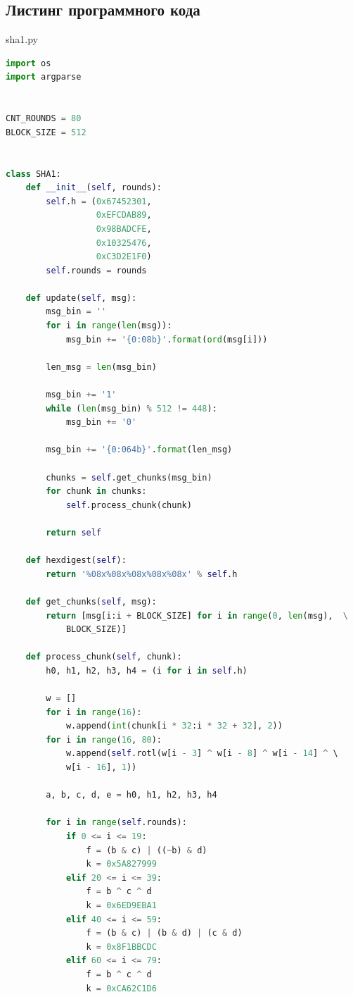 \documentclass[12pt]{article}
\begin{document}
\subsection*{Листинг программного кода}
sha1.py
\begin{lstlisting}[language=Python]
import os
import argparse


CNT_ROUNDS = 80
BLOCK_SIZE = 512


class SHA1:
    def __init__(self, rounds):
        self.h = (0x67452301,
                  0xEFCDAB89,
                  0x98BADCFE,
                  0x10325476,
                  0xC3D2E1F0)
        self.rounds = rounds

    def update(self, msg):
        msg_bin = ''
        for i in range(len(msg)):
            msg_bin += '{0:08b}'.format(ord(msg[i]))

        len_msg = len(msg_bin)

        msg_bin += '1'
        while (len(msg_bin) % 512 != 448):
            msg_bin += '0'

        msg_bin += '{0:064b}'.format(len_msg)

        chunks = self.get_chunks(msg_bin)
        for chunk in chunks:
            self.process_chunk(chunk)

        return self

    def hexdigest(self):
        return '%08x%08x%08x%08x%08x' % self.h

    def get_chunks(self, msg):
        return [msg[i:i + BLOCK_SIZE] for i in range(0, len(msg),  \
            BLOCK_SIZE)]

    def process_chunk(self, chunk):
        h0, h1, h2, h3, h4 = (i for i in self.h)

        w = []
        for i in range(16):
            w.append(int(chunk[i * 32:i * 32 + 32], 2))
        for i in range(16, 80):
            w.append(self.rotl(w[i - 3] ^ w[i - 8] ^ w[i - 14] ^ \ 
            w[i - 16], 1))

        a, b, c, d, e = h0, h1, h2, h3, h4

        for i in range(self.rounds):
            if 0 <= i <= 19:
                f = (b & c) | ((~b) & d)
                k = 0x5A827999
            elif 20 <= i <= 39:
                f = b ^ c ^ d
                k = 0x6ED9EBA1
            elif 40 <= i <= 59:
                f = (b & c) | (b & d) | (c & d)
                k = 0x8F1BBCDC
            elif 60 <= i <= 79:
                f = b ^ c ^ d
                k = 0xCA62C1D6


\end{lstlisting}
\end{document}
